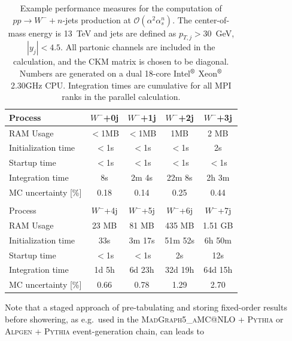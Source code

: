 \documentclass{article}
\begin{document}
\begin{table}
  \begin{center}
  \begin{tabular}{lcccc}
    \hline
    Process & $W^-$+0j & $W^-$+1j & $W^-$+2j & $W^-$+3j \\\hline
    RAM Usage & $<$1MB & $<$1MB & 1MB & 2 MB \\
    Initialization time & $<$1s & $<$1s & $<$1s & 2s \\
    Startup time & $<$1s & $<$1s & $<$1s & $<$1s \\
    Integration time & 8s & 2m 4s & 22m 8s & 2h 3m \\
    MC uncertainty [\%] & 0.18 & 0.14 & 0.25 & 0.44 \\
    \hline\\[1mm]
    \hline
    Process & $W^-$+4j & $W^-$+5j & $W^-$+6j & $W^-$+7j \\\hline
    RAM Usage & 23 MB & 81 MB & 435 MB & 1.51 GB \\
    Initialization time & 33s & 3m 17s & 51m 52s & 6h 50m \\
    Startup time & $<$1s & $<$1s & 2s & 12s \\
    Integration time & 1d 5h & 6d 23h & 32d 19h & 64d 15h \\
    MC uncertainty [\%] & 0.66 & 0.78 & 1.29 & 2.70 \\
    \hline
  \end{tabular}
  \caption{Example performance measures for the computation of $pp\to W^-+n$-jets production at $\mathcal{O}(\alpha^2\alpha_s^n)$. 
    The center-of-mass energy is 13~TeV and jets are
    defined as $p_{T,j}>30$~GeV, $|y_j|<4.5$. All partonic channels are included
    in the calculation, and the CKM matrix is chosen to be diagonal.
    Numbers are generated on a dual 18-core Intel$^\text{\textregistered}$
    Xeon$^\text{\textregistered}$ 2.30GHz CPU. Integration times are cumulative for all MPI ranks in the parallel calculation.
    \label{tab:lo_gen_perf}}
  \end{center}
\end{table}
Note that a staged approach of pre-tabulating and storing fixed-order results 
before showering, as e.g.\ used in the 
\textsc{MadGraph5\_aMC@NLO} + \textsc{Pythia} or 
\textsc{Alpgen} + \textsc{Pythia} event-generation chain, can leads to 
\end{document}
